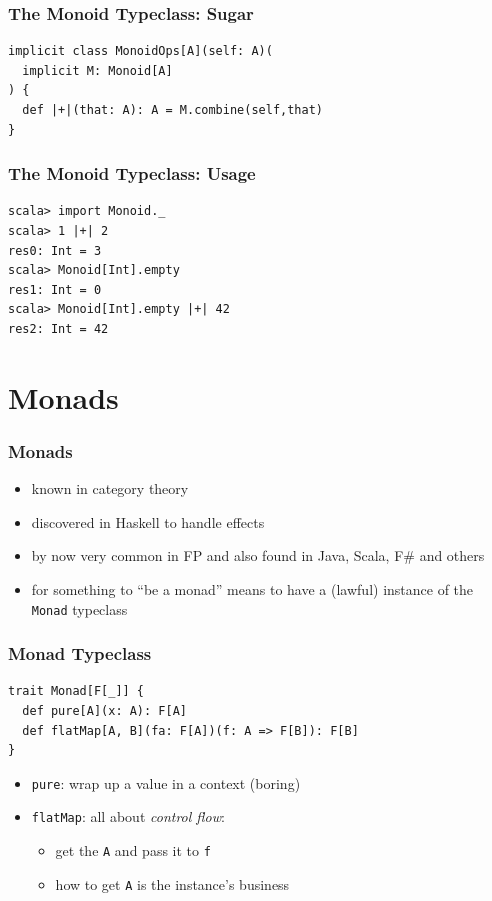 \documentclass{beamer}
\begin{document}
\begin{frame}[fragile]
  \frametitle{The Monoid Typeclass: Sugar}
\begin{verbatim}
implicit class MonoidOps[A](self: A)(
  implicit M: Monoid[A]
) {
  def |+|(that: A): A = M.combine(self,that)
}
\end{verbatim}
\end{frame}

\begin{frame}[fragile]
  \frametitle{The Monoid Typeclass: Usage}
\begin{verbatim}
scala> import Monoid._
scala> 1 |+| 2
res0: Int = 3
scala> Monoid[Int].empty
res1: Int = 0
scala> Monoid[Int].empty |+| 42
res2: Int = 42
\end{verbatim}
\end{frame}

\section{Monads}

\begin{frame}
  \frametitle{Monads}
  \begin{itemize}
  \item known in category theory
  \item discovered in Haskell to handle effects
  \item by now very common in FP and also found in Java, Scala, F\#
    and others
  \item for something to ``be a monad'' means to have a (lawful)
    instance of the \texttt{Monad} typeclass
  \end{itemize}
\end{frame}

\begin{frame}[fragile]
  \frametitle{Monad Typeclass}
\begin{verbatim}
trait Monad[F[_]] {
  def pure[A](x: A): F[A]
  def flatMap[A, B](fa: F[A])(f: A => F[B]): F[B]
}
\end{verbatim}
  \begin{itemize}
  \item \texttt{pure}: wrap up a value in a context (boring)
  \item \texttt{flatMap}: all about \textit{control flow}:
    \begin{itemize}
    \item get the \texttt{A} and pass it to \texttt{f}
    \item how to get \texttt{A} is the instance's business
    \end{itemize}
  \end{itemize}
\end{frame}
\end{document}
